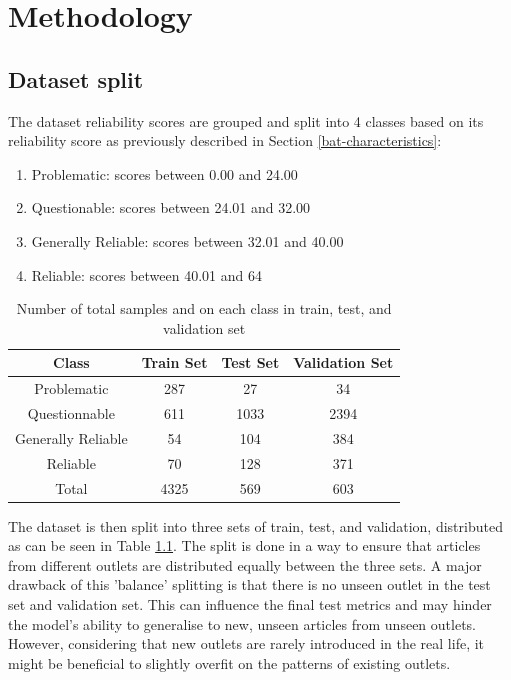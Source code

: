\chapter{Methodology}
\label{cha:4}

\section{Dataset split}

The dataset reliability scores are grouped and split into 4 classes based on its reliability score as previously described in Section \ref{bat-characteristics}:
\begin{enumerate}
    \item Problematic: scores between 0.00 and 24.00
    \item Questionable: scores between 24.01 and 32.00
    \item Generally Reliable: scores between 32.01 and 40.00
    \item Reliable: scores between 40.01 and 64
\end{enumerate}

\begin{table}[htbp]
    \centering
    \begin{tabular}{| c | c | c | c |}
        \hline
        Class              & Train Set & Test Set & Validation Set \\
        \hline
        Problematic        & 287       & 27       & 34             \\
        Questionnable      & 611       & 1033     & 2394           \\
        Generally Reliable & 54        & 104      & 384            \\
        Reliable           & 70        & 128      & 371            \\
        \hline
        Total              & 4325      & 569      & 603            \\
        \hline
    \end{tabular}
    \caption{Number of total samples and on each class in train, test, and validation set}
    \label{table:dataset_split}
\end{table}

The dataset is then split into three sets of train, test, and validation, distributed as can be seen in Table \ref{table:dataset_split}. The split is done in a way to ensure that articles from different outlets are distributed equally between the three sets. A major drawback of this 'balance' splitting is that there is no unseen outlet in the test set and validation set. This can influence the final test metrics and may hinder the model's ability to generalise to new, unseen articles from unseen outlets. However, considering that new outlets are rarely introduced in the real life, it might be beneficial to slightly overfit on the patterns of existing outlets.


